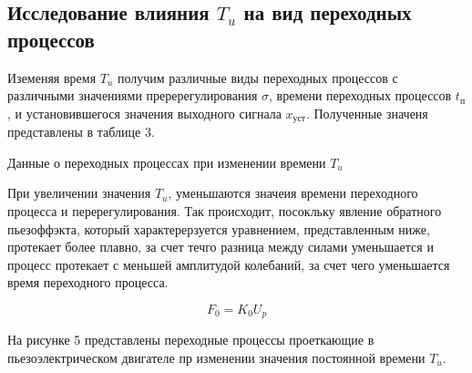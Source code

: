 \documentclass[a4paper, 12pt]{article}
\begin{document}
\newpage
\begin{center}
	

\section{ Исследование влияния $T_u$ на вид переходных процессов}
\end{center}
\par Иземеняя время $T_u$ получим различные виды переходных процессов с различными значениями преререгулирования $\sigma$, времени переходных процессов $t_\text{п}$, и установившегося значения выходного сигнала $x_\text{уст}$. Полученные значеня представлены в таблице 3.
\begin{table}[h!]
    \centering
    \begin{threeparttable}
        \caption{Данные о переходных процессах при изменении времени $T_u$}
    \end{threeparttable}
\end{table} \par
При увеличении значения $T_u$, уменьшаются значеия времени переходного процесса и перерегулирования. Так происходит, посокльку явление обратного пьезоффэкта, который характерерзуется уравнением, представленным ниже, протекает более плавно, за счет течго разница между силами уменьшается и процесс протекает с меньшей амплитудой колебаний, за счет чего уменьшается время переходного процесса. \par
\begin{equation*}
    F_0 = K_0U_p
\end{equation*} \par
На рисунке 5 представлены переходные процессы проеткающие в пьезоэлектрическом двигателе пр изменении значения постоянной времени $T_u$.
\end{document}
